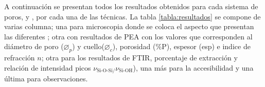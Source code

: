 	 		A continuación se presentan todos los resultados obtenidos para cada sistema de poros, \pdmF\space y \pdmC, por cada una de las técnicas. La tabla \ref{tabla:resultados} se compone de varias columna; una para microscopia donde se coloca el aspecto que presentan las diferentes \pdm; otra con resultados de PEA con los valores que corresponden al diámetro de poro ($\varnothing_p$) y cuello($\varnothing_c$), porosidad (\%P), espesor (esp) e indice de refracción $n$; otra para los resultados de FTIR, porcentaje de extracción y relación de intensidad picos $\nu_{\text{Si-O-Si/}}\nu_{\text{Si-OH}}$), una más para la accesibilidad y una última para observaciones.  

